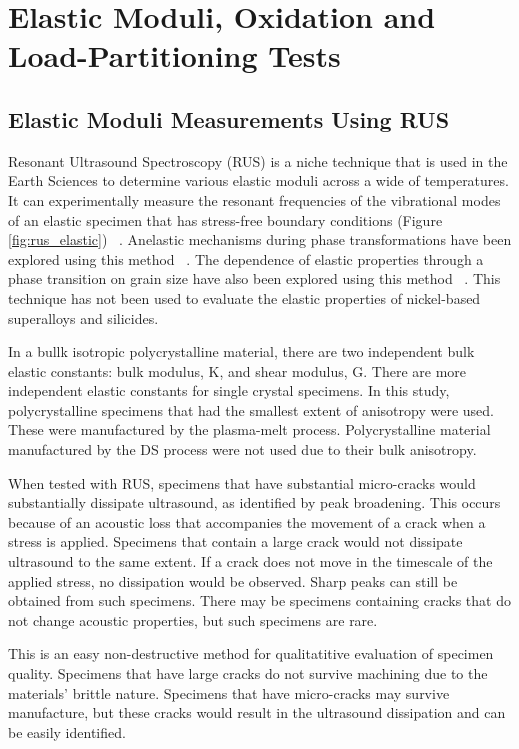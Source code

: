 

\chapter{Elastic Moduli, Oxidation and Load-Partitioning Tests}

\section{Elastic Moduli Measurements Using RUS}

Resonant Ultrasound Spectroscopy (RUS) is a niche technique that is used in the Earth Sciences to determine various elastic moduli across a wide of temperatures.  It can experimentally measure the resonant frequencies of the vibrational modes of an elastic specimen that has stress-free boundary conditions (Figure \ref{fig:rus_elastic}) ~\cite{maynard92}.  Anelastic mechanisms during phase transformations have been explored using this method ~\cite{zhang10}.  The dependence of elastic properties through a phase transition on grain size have also been explored using this method ~\cite{carpenter06, mcknight08, mcknight09}.  This technique has not been used to evaluate the elastic properties of nickel-based superalloys and silicides.

In a bullk isotropic polycrystalline material, there are two independent bulk elastic constants:  bulk modulus, K, and shear modulus, G.  There are more independent elastic constants for single crystal specimens.  In this study, polycrystalline specimens that had the smallest extent of anisotropy were used.  These were manufactured by the plasma-melt process.  Polycrystalline material manufactured by the DS process were not used due to their bulk anisotropy.

When tested with RUS, specimens that have substantial micro-cracks would substantially dissipate ultrasound, as identified by peak broadening.  This occurs because of an acoustic loss that accompanies the movement of a crack when a stress is applied.  Specimens that contain a large crack would not dissipate ultrasound to the same extent.  If a crack does not move in the timescale of the applied stress, no dissipation would be observed.  Sharp peaks can still be obtained from such specimens.  There may be specimens containing cracks that do not change  acoustic properties, but such specimens are rare.  

This is an easy non-destructive method for qualitatitive evaluation of specimen quality.  Specimens that have large cracks do not survive machining due to the materials' brittle nature.  Specimens that have micro-cracks may survive manufacture, but these cracks would result in the ultrasound dissipation and can be easily identified.

